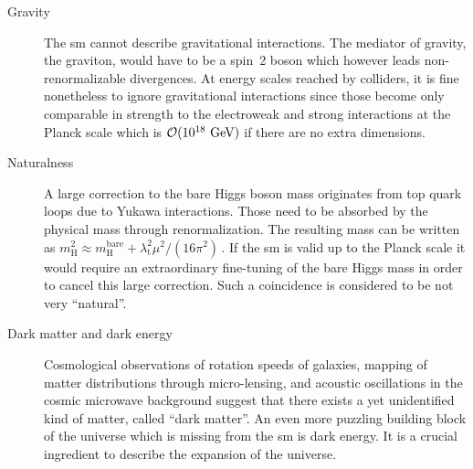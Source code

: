 \begin{description}
\item[Gravity] The \gls{sm} cannot describe gravitational interactions. The mediator of gravity, the graviton, would have to be a spin~2 boson which however leads non-renormalizable divergences. At energy scales reached by colliders, it is fine nonetheless to ignore gravitational interactions since those become only comparable in strength to the electroweak and strong interactions at the Planck scale which is $\mathcal{O}(10^{18}~\textrm{GeV})$ if there are no extra dimensions.
\item[Naturalness] A large correction to the bare Higgs boson mass originates from top quark loops due to Yukawa interactions. Those need to be absorbed by the physical mass through renormalization. The resulting mass can be written as $m^{2}_\mathrm{H}\approx m^\mathrm{bare}_\mathrm{H}+\lambda_\mathrm{t}^{2}\mu^2/(16\pi^2)\,$. If the \gls{sm} is valid up to the Planck scale it would require an extraordinary fine-tuning of the bare Higgs mass in order to cancel this large correction. Such a coincidence is considered to be not very ``natural''.
\item[Dark matter and dark energy] Cosmological observations of rotation speeds of galaxies, mapping of matter distributions through micro-lensing, and acoustic oscillations in the cosmic microwave background suggest that there exists a yet unidentified kind of matter, called ``dark matter''. An even more puzzling building block of the universe which is missing from the \gls{sm} is dark energy. It is a crucial ingredient to describe the expansion of the universe.

\end{description}


